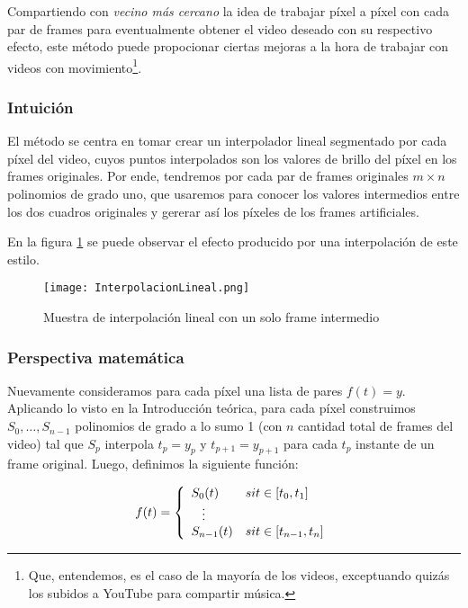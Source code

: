 Compartiendo con \emph{vecino m\'as cercano} la idea de trabajar píxel a píxel con cada par de frames para eventualmente obtener el video deseado con su respectivo efecto, este método puede propocionar ciertas mejoras a la hora de trabajar con videos con movimiento\footnote{Que, entendemos, es el caso de la mayoría de los videos, exceptuando quizás los subidos a YouTube para compartir música.}.

\subsubsection*{\bf{Intuición}}
El m\'etodo se centra en tomar crear un interpolador lineal segmentado por cada píxel del video, cuyos puntos interpolados son los valores de brillo del píxel en los frames originales. Por ende, tendremos por cada par de frames originales $m \times n$ polinomios de grado uno, que usaremos para conocer los valores intermedios entre los dos cuadros originales y gererar así los píxeles de los frames artificiales.

En la figura \ref{fig:lineal} se puede observar el efecto producido por una interpolación de este estilo.

\begin{figure}[h!]
  \centering
    \texttt{[image: InterpolacionLineal.png]}
     \caption{Muestra de interpolaci\'on lineal con un solo frame intermedio}\label{fig:lineal}
\end{figure}
\noindent

\subsubsection*{\bf{Perspectiva matem\'atica}}
Nuevamente consideramos para cada píxel una lista de pares $f(t)=y$. Aplicando lo visto en la Introducción teórica, para cada píxel construimos $S_0, \ldots, S_{n - 1}$ polinomios de grado a lo sumo 1 (con $n$ cantidad total de frames del video) tal que $S_p$ interpola $t_p=y_p$ y $t_{p + 1}=y_{p+1}$ para cada $t_p$ instante de un frame original. Luego, definimos la siguiente funci\'on:
 
\[
f(t) = 
\left\{
    \begin{array}{ll}
        S_0(t)  & \mbox{si } t \in [t_{0}, t_1] \\
        \hspace{0.3cm}\vdots \\     
        S_{n - 1}(t) & \mbox{si } t \in [t_{n - 1}, t_n]
    \end{array}
\right.
\]

